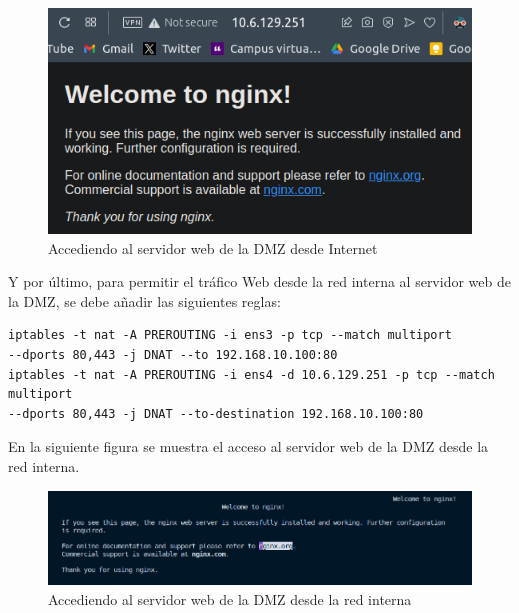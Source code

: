 \documentclass[11pt]{report} %
\begin{document}
\begin{figure}[H]
  \centering
  \includegraphics[scale=0.55]{img/nginx_navegador.png}
  \caption{Accediendo al servidor web de la DMZ desde Internet}
  \label{fig:permitir tráfico web desde Internet al servidor web que se encuentra en la DMZ}
\end{figure}

Y por último, para permitir el tráfico Web desde la red interna al servidor web de la DMZ, se debe añadir las siguientes reglas:
\begin{verbatim}
iptables -t nat -A PREROUTING -i ens3 -p tcp --match multiport 
--dports 80,443 -j DNAT --to 192.168.10.100:80 
iptables -t nat -A PREROUTING -i ens4 -d 10.6.129.251 -p tcp --match multiport 
--dports 80,443 -j DNAT --to-destination 192.168.10.100:80 
\end{verbatim}

\cleardoublepage

En la siguiente figura se muestra el acceso al servidor web de la DMZ desde la red interna.

\begin{figure}[H]
  \centering
  \includegraphics[scale=0.5]{img/nginx_cliente.png}
  \caption{Accediendo al servidor web de la DMZ desde la red interna}
  \label{fig:permitir tráfico web desde la red interna al servidor web de la DMZ}
\end{figure}
\end{document}
